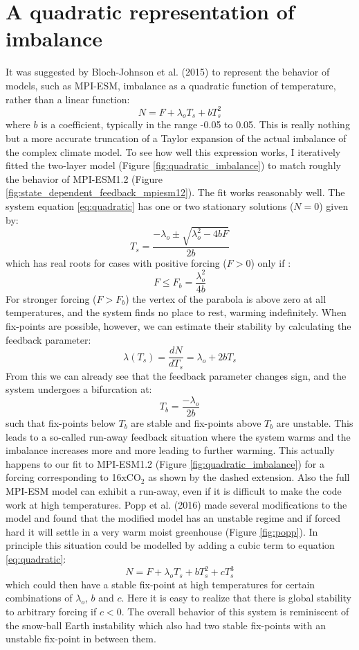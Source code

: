 \documentclass[12pt]{book}
\begin{document}
\section{A quadratic representation of imbalance}
\label{sec:quadratic}
It was suggested by Bloch-Johnson et al. (2015) to represent the behavior of models, such as MPI-ESM, imbalance as a quadratic function of temperature, rather than a linear function:
\begin{equation}
N=F+\lambda_o T_s+ bT_s^2
\label{eq:quadratic}
\end{equation}
where $b$ is a coefficient, typically in the range -0.05 to 0.05. This is really nothing but a more accurate truncation of a Taylor expansion of the actual imbalance of the complex climate model. To see how well this expression works, I iteratively fitted the two-layer model (Figure \ref{fig:quadratic_imbalance}) to match roughly the behavior of MPI-ESM1.2 (Figure \ref{fig:state_dependent_feedback_mpiesm12}). The fit works reasonably well.
The system equation \ref{eq:quadratic} has one or two stationary solutions ($N=0$) given by:
$$T_s=\frac{-\lambda_o\pm \sqrt{\lambda_o^2-4bF}}{2b}$$
which has real roots for cases with positive forcing ($F>0$) only if :
$$F \le F_b=\frac{\lambda_o^2}{4b}$$
For stronger forcing ($F>F_b$) the vertex of the parabola is above zero at all temperatures, and the system finds no place to rest, warming indefinitely. When fix-points are possible, however, we can estimate their stability by calculating the feedback parameter:
$$\lambda(T_s)=\frac{dN}{dT_s} = \lambda_o+2bT_s$$
From this we can already see that the feedback parameter changes sign, and the system undergoes a bifurcation at:
\begin{equation}
T_b=\frac{-\lambda_o}{2b}
\label{eq:quadratic_runaway}
\end{equation}
such that fix-points below $T_b$ are stable and fix-points above $T_b$ are unstable. This leads to a so-called run-away feedback situation where the system warms and the imbalance increases more and more leading to further warming. This actually happens to our fit to MPI-ESM1.2 (Figure \ref{fig:quadratic_imbalance}) for a forcing corresponding to 16xCO$_2$ as shown by the dashed extension. Also the full MPI-ESM model can exhibit a run-away, even if it is difficult to make the code work at high temperatures. Popp et al. (2016) made several modifications to the model and found that the modified model has an unstable regime and if forced hard it will settle in a very warm moist greenhouse (Figure \ref{fig:popp}). In principle this situation could be modelled by adding a cubic term to equation \ref{eq:quadratic}:
$$N=F+\lambda_o T_s+ bT_s^2+cT_s^3$$
which could then have a stable fix-point at high temperatures for certain combinations of $\lambda_o$, $b$ and $c$. Here it is easy to realize that there is global stability to arbitrary forcing if $c<0$. The overall behavior of this system is reminiscent of the snow-ball Earth instability which also had two stable fix-points with an unstable fix-point in between them.
\end{document}
